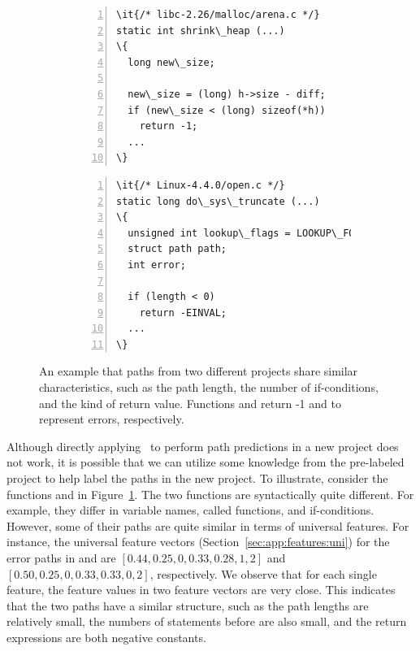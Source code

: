 \documentclass[12pt]{report}	%
\begin{document}
\begin{figure}[t]
\centering
\begin{subfigure}[b]{0.5\textwidth}
\begin{Verbatim}[numbers=left,xleftmargin=6mm,fontsize=\footnotesize,
    commandchars=\\\{\}]
\it{/* libc-2.26/malloc/arena.c */}
static int shrink\_heap (...)
\{
  long new\_size;

  new\_size = (long) h->size - diff; 
  if (new\_size < (long) sizeof(*h))
    return -1;
  ...
\}
\end{Verbatim}
\end{subfigure}%
\hfill
\begin{subfigure}[b]{0.5\textwidth}
\begin{Verbatim}[numbers=left,xleftmargin=6mm,fontsize=\footnotesize,
    commandchars=\\\{\}]
\it{/* Linux-4.4.0/open.c */}
static long do\_sys\_truncate (...)
\{
  unsigned int lookup\_flags = LOOKUP\_FOLLOW;
  struct path path;
  int error;

  if (length < 0)
    return -EINVAL;
  ...
\}
\end{Verbatim}
\end{subfigure}
\caption[An example that two similar paths]
{An example that paths from two different projects share similar characteristics,
such as the path length, the number of if-conditions, and the kind of return value.
Functions  and 
return -1 and  to represent errors, respectively.
}
\label{fig:transfer}
\end{figure}

%
Although directly applying \sm\ to perform path predictions in a new
project does not work, 
it is possible that we can utilize some knowledge from 
the pre-labeled project to help label the paths in the new project.
%
To illustrate, consider the functions
 and 
in Figure~\ref{fig:transfer}. 
%
The two functions are 
syntactically quite different. For example, they differ
in variable names, called functions, and if-conditions.
However, some of their paths are quite similar in terms of 
universal features.
%
For instance,
the universal feature vectors (Section~\ref{sec:app:features:uni})
for the error paths in  and  are 
$[0.44, 0.25, 0, 0.33, 0.28, 1, 2]$ and
$[0.50, 0.25, 0, 0.33, 0.33, 0, 2]$,
respectively.
%
We observe that for each single feature, the feature values in
two feature vectors are very close. 
This indicates that the two paths have a similar structure,
such as the path lengths are relatively small,
the numbers of statements before  are also small,
and the return expressions are both negative constants. 
\end{document}
